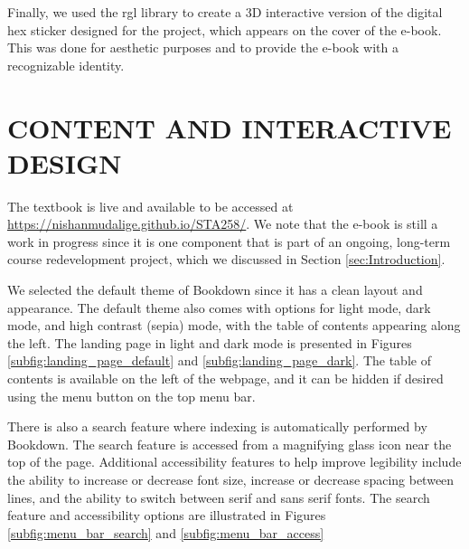 \documentclass[11pt]{article}
\begin{document}
Finally, we used the rgl library to create a 3D interactive version of the digital hex sticker designed for the project, which appears on the cover of the e-book.
This was done for aesthetic purposes and to provide the e-book with a recognizable identity.


\section{CONTENT AND INTERACTIVE DESIGN}

The textbook is live and available to be accessed at \href{https://nishanmudalige.github.io/STA258/}{https://nishanmudalige.github.io/STA258/}.
We note that the e-book is still a work in progress since it is one component that is part of an ongoing, long-term course redevelopment project, which we discussed in Section \ref{sec:Introduction}.

We selected the default theme of Bookdown since it has a clean layout and appearance.
The default theme also comes with options for light mode, dark mode, and high contrast (sepia) mode, with the table of contents appearing along the left.
The landing page in light and dark mode is presented in Figures \ref{subfig:landing_page_default} and \ref{subfig:landing_page_dark}.
The table of contents is available on the left of the webpage, and it can be hidden if desired using the menu button on the top menu bar.

There is also a search feature where indexing is automatically performed by Bookdown. The search feature is accessed from a magnifying glass icon near the top of the page.
Additional accessibility features to help improve legibility include the ability to increase or decrease font size, increase or decrease spacing between lines, and the ability to switch between serif and sans serif fonts. The search feature and accessibility options are illustrated in Figures \ref{subfig:menu_bar_search} and \ref{subfig:menu_bar_access}
\end{document}
